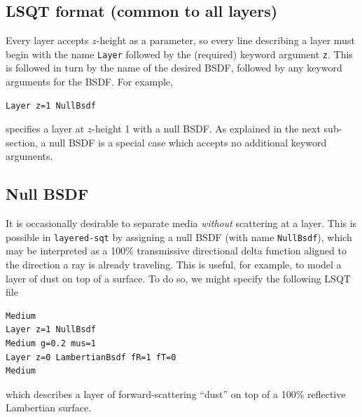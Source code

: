 \documentclass[
    twoside,
    twocolumn,
    letterpaper,
    10pt]{article}
\begin{document}
\subsection{LSQT format (common to all layers)}

Every layer accepts $z$-height as a parameter, so every line describing a 
layer must begin with the name \texttt{Layer} followed by the (required) 
keyword argument \texttt{z}. This is followed in turn by the name of the 
desired BSDF, followed by any keyword arguments for the BSDF. For example,
\begin{verbatim}
Layer z=1 NullBsdf
\end{verbatim}
specifies a layer at $z$-height 1 with a null BSDF. As explained in 
the next sub-section, a null BSDF is a special case which accepts no additional
keyword arguments.


\subsection{Null BSDF}

It is occasionally desirable to separate media 
\emph{without} scattering at a layer. This is possible in
\texttt{layered-sqt} by assigning a null BSDF (with name 
\texttt{NullBsdf}), which may be interpreted as a 100\% transmissive 
directional delta function aligned to the direction a ray is already 
traveling. This is useful, for example, to model a layer of dust on 
top of a surface. To do so, we might specify the following
LSQT file
\begin{verbatim}
Medium
Layer z=1 NullBsdf
Medium g=0.2 mus=1
Layer z=0 LambertianBsdf fR=1 fT=0
Medium
\end{verbatim}
which describes a layer of forward-scattering ``dust'' on top 
of a 100\% reflective Lambertian surface.
\end{document}
